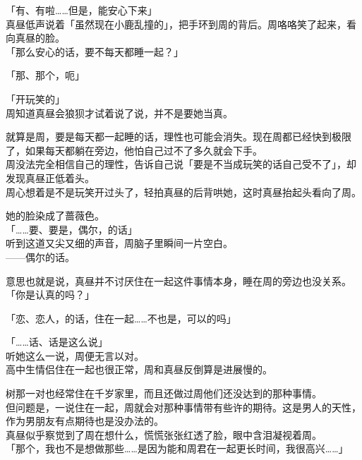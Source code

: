 「有、有啦……但是，能安心下来」\\

真昼低声说着「虽然现在小鹿乱撞的」，把手环到周的背后。周咯咯笑了起来，看向真昼的脸。\\

「那么安心的话，要不每天都睡一起？」

「那、那个，呃」

「开玩笑的」\\

周知道真昼会狼狈才试着说了说，并不是要她当真。

就算是周，要是每天都一起睡的话，理性也可能会消失。现在周都已经快到极限了，如果每天都躺在旁边，他怕自己过不了多久就会下手。\\

周没法完全相信自己的理性，告诉自己说「要是不当成玩笑的话自己受不了」，却发现真昼正低着头。\\

周心想着是不是玩笑开过头了，轻拍真昼的后背哄她，这时真昼抬起头看向了周。

她的脸染成了蔷薇色。\\

「……要、要是，偶尔，的话」\\

听到这道又尖又细的声音，周脑子里瞬间一片空白。\\

——偶尔的话。

意思也就是说，真昼并不讨厌住在一起这件事情本身，睡在周的旁边也没关系。\\

「你是认真的吗？」

「恋、恋人，的话，住在一起……不也是，可以的吗」

「……话、话是这么说」\\

听她这么一说，周便无言以对。\\

高中生情侣住在一起也很正常，周和真昼反倒算是进展慢的。

树那一对也经常住在千岁家里，而且还做过周他们还没达到的那种事情。\\

但问题是，一说住在一起，周就会对那种事情带有些许的期待。这是男人的天性，作为男朋友有点期待也是没办法的。\\

真昼似乎察觉到了周在想什么，慌慌张张红透了脸，眼中含泪凝视着周。\\

「那个，我也不是想做那些……是因为能和周君在一起更长时间，我很高兴……」

